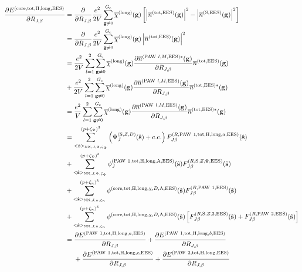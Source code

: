 \documentclass[paper=a4, fontsize=11pt]{article} %
\numberwithin{equation}{section} %
\numberwithin{figure}{section} %
\numberwithin{table}{section} %
\newcommand{\p}{\partial}
\newcommand{\ol}{\overline}
\newcommand{\bs}{{\bf{s}}}
\newcommand{\bg}{{\bf{g}}}
\newcommand{\hs}{{\hat{\bf{s}}}}
\newcommand{\rS}{{\mathrm{S}}}
\newcommand{\rEES}{{\mathrm{EES}}}
\newcommand{\rcore}{{\mathrm{core}}}
\newcommand{\rNN}{{\mathrm{NN}}}
\newcommand{\rcc}{{\mathrm{c.c.}}}
\newcommand{\rlong}{{\mathrm{long}}}
\newcommand{\rP}{{\mathrm{PAW}}}
\newcommand{\rH}{{\mathrm{H}}}
\newcommand{\rA}{{\mathrm{A}}}
\newcommand{\rtot}{{\mathrm{tot}}}
\newcommand{\RJb}{{R_{J,\beta}}}
\newcommand{\Gc}{{G_{\mathrm{c}}}}
\newcommand{\pzp}{{(p+\zeta_{\Psi})^3}}
\newcommand{\pzn}{{(p+\zeta_n)^3}}
\newcommand{\hsJp}{{<\hs>_{\rNN,J,\Psi,\zeta_\Psi}}}
\newcommand{\hsJn}{{<\hs>_{\rNN,J,n,\zeta_n}}}
\begin{document}
\begin{equation}
\begin{split}
\frac{\p E^{(\rcore,\rtot,\rH,\rlong,\rEES)}}{\p \RJb}
&= \frac{\p }{\p \RJb}
 \frac{e^2}{2V} \sum_{\bg \neq 0}^\Gc \ol \chi^{(\rlong)} (\bg)\left[\left|\ol{n}^{(\rtot,\rEES)}(\bg)\right|^2 - \left|\ol{n}^{(\rS,\rEES)}(\bg)\right|^2 \right] \\
 &= \frac{\p }{\p \RJb}
 \frac{e^2}{2V} \sum_{\bg \neq 0}^\Gc \ol \chi^{(\rlong)} (\bg)\left|\ol{n}^{(\rtot,\rEES)}(\bg)\right|^2 \\
&= \frac{e^2}{2V}  \sum_{l=1}^2 \sum_{\bg \neq 0}^{\Gc} \ol \chi^{(\rlong)} (\bg) \frac{\p \ol{n}^{(\rP\ l,M,\rEES)*}(\bg)}{\p \RJb}\ol{n}^{(\rtot,\rEES)}(\bg) \\
&+ \frac{e^2}{2V}  \sum_{l=1}^2 \sum_{\bg \neq 0}^{\Gc} \ol \chi^{(\rlong)} (\bg) \frac{\p \ol{n}^{(\rP\ l,M,\rEES)}(\bg)}{\p \RJb}\ol{n}^{(\rtot,\rEES)*}(\bg) \\
&= \frac{e^2}{V}  \sum_{l=1}^2 \sum_{\bg \neq 0}^{\Gc} \ol \chi^{(\rlong)} (\bg) \frac{\p \ol{n}^{(\rP\ l,M,\rEES)}(\bg)}{\p \RJb}\ol{n}^{(\rtot,\rEES)*}(\bg) \\
&=\sum_{\hsJp}^{\pzp} \left(\Psi_J^{(\rS,Z,D)}(\hat \bs)+ \rcc\right) F_{J\beta}^{(R,\rP\ 1,\rtot,\rH,\rlong,a,\rEES)}(\hs) \\
&+ \sum_{\hsJp}^{\pzp} \phi_J^{(\rP\ 1,\rtot,\rH,\rlong,\rA,\rEES)}(\hs)F_{J\beta}^{(R,\rS,Z,\Psi,\rEES)}(\hs) \\
&+ \sum_{\hsJn}^{\pzn} \phi^{(\rcore,\rtot,\rH,\rlong,\chi,D,\rA,\rEES)}(\hs) F_{J\beta}^{(R,\rP\ 1,\rEES)}(\hs) \\
&+ \sum_{\hsJn}^{\pzn} \phi^{(\rcore,\rtot,\rH,\rlong,\chi,D,\rA,\rEES)}(\hs) \left[F_{J\beta}^{(R,\rS,Z,2,\rEES)}(\hs)+ F_{J\beta}^{(R,\rP\ 2,\rEES)}(\hs)\right]\\
&= \frac{\p E^{(\rP\ 1,\rtot,\rH,\rlong,a,\rEES)}}{\p \RJb}
+ \frac{\p E^{(\rP\ 1,\rtot,\rH,\rlong,b,\rEES)}}{\p \RJb}\\
&\ \ \ \ + \frac{\p E^{(\rP\ 1,\rtot,\rH,\rlong,c,\rEES)}}{\p \RJb} + \frac{\p E^{(\rP\ 2,\rtot,\rH,\rlong,\rEES)}}{\p \RJb}\\
\end{split}
\end{equation}
\end{document}
